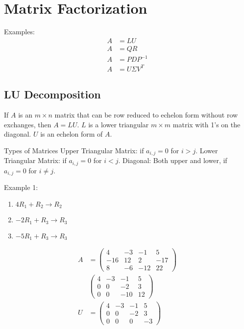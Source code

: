 \section{Matrix Factorization}
Examples:
\begin{align}
    A &= LU \\
    A &= QR \\
    A &= PDP^{-1} \\
    A &= U \Sigma V^T
\end{align}

\subsection{LU Decomposition}
\begin{theorem}
    If \(A\) is an \(m \times n\) matrix that can be row reduced to echelon form without row exchanges, then \(A = LU\). \(L\) is a lower triangular \(m \times m\) matrix with 1's on the diagonal. \(U\) is an echelon form of \(A\).
\end{theorem}

\begin{definition} Types of Matrices
    \newline
    Upper Triangular Matrix: if \(a_{i,j} = 0\) for \(i > j\).
    \newline
    Lower Triangular Matrix: if \(a_{i,j} = 0\) for \(i < j\).
    \newline
    Diagonal: Both upper and lower, if \(a_{i,j} = 0\) for \(i \ne j\).
\end{definition}

\noindent
\newline
Example 1:
\begin{enumerate}
    \item \(4R_1 + R_2 \rightarrow R_2\)
    \item \(-2R_1 + R_3 \rightarrow R_3\)
    \item \(-5R_1 + R_3 \rightarrow R_3\)
\end{enumerate}

\begin{align}
    A &= \begin{pmatrix}
        4 & -3 & -1 & 5 \\
        -16 & 12 & 2 & -17 \\
        8 & -6 & -12 & 22
    \end{pmatrix} \\
    &\begin{pmatrix}
        4 & -3 & -1 & 5 \\
        0 & 0 & -2 & 3 \\
        0 & 0 & -10 & 12
    \end{pmatrix} \\
    U &= \begin{pmatrix}
        4 & -3 & -1 & 5 \\
        0 & 0 & -2 & 3 \\
        0 & 0 & 0 & -3
    \end{pmatrix}
\end{align}

